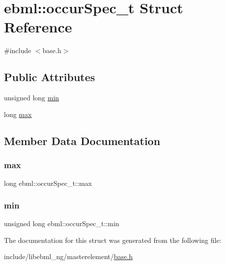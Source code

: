 \hypertarget{structebml_1_1occurSpec__t}{}\section{ebml\+:\+:occur\+Spec\+\_\+t Struct Reference}
\label{structebml_1_1occurSpec__t}


{\ttfamily \#include $<$base.\+h$>$}

\subsection*{Public Attributes}
\begin{DoxyCompactItemize}
\item 
unsigned long \mbox{\hyperlink{structebml_1_1occurSpec__t_ada17a7725f7c9d60ad50f80bef6b6b6d}{min}}
\item 
long \mbox{\hyperlink{structebml_1_1occurSpec__t_a31362ff2c93db2d5ecff3229fce488c7}{max}}
\end{DoxyCompactItemize}


\subsection{Member Data Documentation}
\mbox{\label{structebml_1_1occurSpec__t_a31362ff2c93db2d5ecff3229fce488c7}} 
\subsubsection{\texorpdfstring{max}{max}}
{\footnotesize\ttfamily long ebml\+::occur\+Spec\+\_\+t\+::max}

\mbox{\label{structebml_1_1occurSpec__t_ada17a7725f7c9d60ad50f80bef6b6b6d}} 
\subsubsection{\texorpdfstring{min}{min}}
{\footnotesize\ttfamily unsigned long ebml\+::occur\+Spec\+\_\+t\+::min}



The documentation for this struct was generated from the following file\+:\begin{DoxyCompactItemize}
\item 
include/libebml\+\_\+ng/masterelement/\mbox{\hyperlink{base_8h}{base.\+h}}\end{DoxyCompactItemize}
